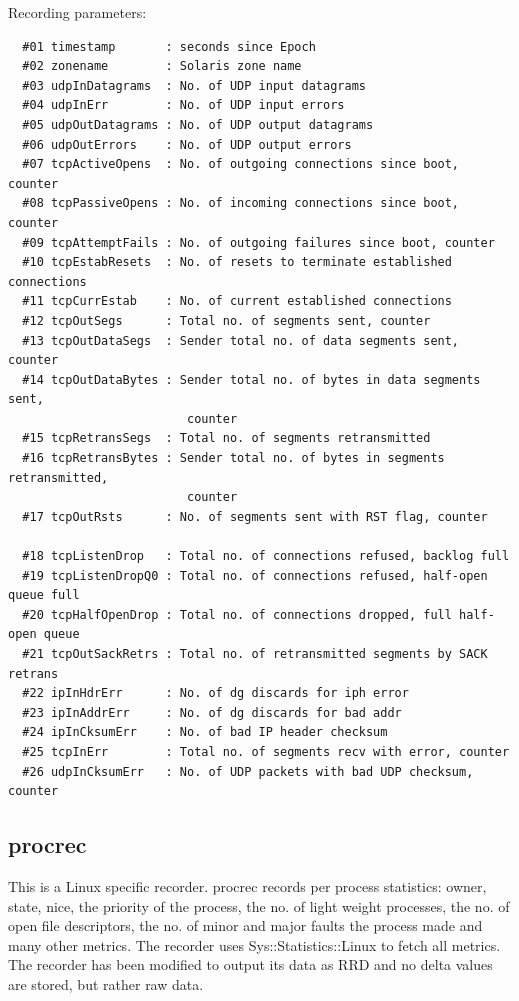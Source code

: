 \noindent
Recording parameters:

\begin{verbatim}
  #01 timestamp       : seconds since Epoch
  #02 zonename        : Solaris zone name
  #03 udpInDatagrams  : No. of UDP input datagrams
  #04 udpInErr        : No. of UDP input errors
  #05 udpOutDatagrams : No. of UDP output datagrams
  #06 udpOutErrors    : No. of UDP output errors
  #07 tcpActiveOpens  : No. of outgoing connections since boot, counter
  #08 tcpPassiveOpens : No. of incoming connections since boot, counter
  #09 tcpAttemptFails : No. of outgoing failures since boot, counter
  #10 tcpEstabResets  : No. of resets to terminate established connections
  #11 tcpCurrEstab    : No. of current established connections
  #12 tcpOutSegs      : Total no. of segments sent, counter
  #13 tcpOutDataSegs  : Sender total no. of data segments sent, counter
  #14 tcpOutDataBytes : Sender total no. of bytes in data segments sent,
                         counter
  #15 tcpRetransSegs  : Total no. of segments retransmitted
  #16 tcpRetransBytes : Sender total no. of bytes in segments retransmitted,
                         counter
  #17 tcpOutRsts      : No. of segments sent with RST flag, counter

  #18 tcpListenDrop   : Total no. of connections refused, backlog full
  #19 tcpListenDropQ0 : Total no. of connections refused, half-open queue full
  #20 tcpHalfOpenDrop : Total no. of connections dropped, full half-open queue
  #21 tcpOutSackRetrs : Total no. of retransmitted segments by SACK retrans
  #22 ipInHdrErr      : No. of dg discards for iph error
  #23 ipInAddrErr     : No. of dg discards for bad addr
  #24 ipInCksumErr    : No. of bad IP header checksum
  #25 tcpInErr        : Total no. of segments recv with error, counter
  #26 udpInCksumErr   : No. of UDP packets with bad UDP checksum, counter
\end{verbatim}



\subsection*{procrec}
This is a Linux specific recorder. procrec records per process statistics: 
owner, state, nice, the priority of the process, the no. of light weight 
processes, the no. of open file descriptors, the no. of minor and major faults 
the process made and many other metrics. The recorder uses 
Sys::Statistics::Linux to fetch all metrics. The recorder has been modified to 
output its data as RRD and no delta values are stored, but rather raw data. 


